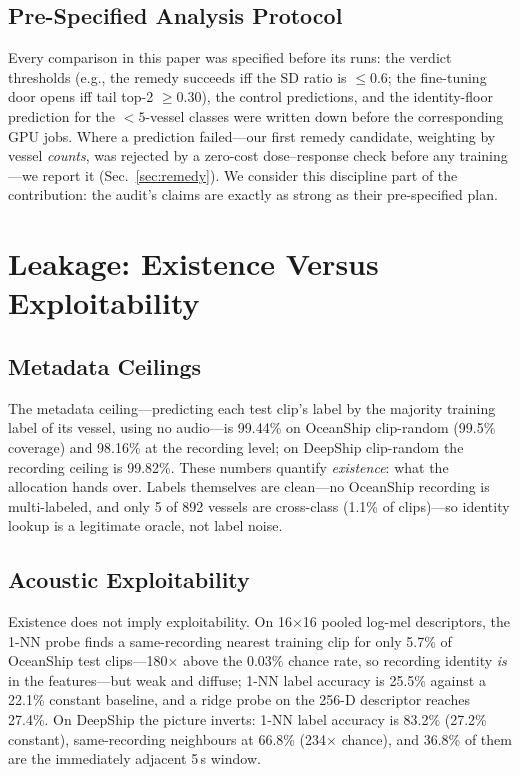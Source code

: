 ﻿\documentclass[journal]{IEEEtran}
\begin{document}
\subsection{Pre-Specified Analysis Protocol}
Every comparison in this paper was specified before its runs: the verdict thresholds (e.g., the
remedy succeeds iff the SD ratio is $\le0.6$; the fine-tuning door opens iff tail top-2
$\ge0.30$), the control predictions, and the identity-floor prediction for the $<5$-vessel classes
were written down before the corresponding GPU jobs. Where a prediction failed---our first remedy
candidate, weighting by vessel \emph{counts}, was rejected by a zero-cost dose--response check
before any training---we report it (Sec.~\ref{sec:remedy}). We consider this discipline part of
the contribution: the audit's claims are exactly as strong as their pre-specified plan.

\section{Leakage: Existence Versus Exploitability}
\label{sec:leak}

\subsection{Metadata Ceilings}
The metadata ceiling---predicting each test clip's label by the majority training label of its
vessel, using no audio---is 99.44\% on OceanShip clip-random (99.5\% coverage) and 98.16\% at the
recording level; on DeepShip clip-random the recording ceiling is 99.82\%. These numbers quantify
\emph{existence}: what the allocation hands over. Labels themselves are clean---no OceanShip
recording is multi-labeled, and only 5 of 892 vessels are cross-class (1.1\% of clips)---so
identity lookup is a legitimate oracle, not label noise.

\subsection{Acoustic Exploitability}
Existence does not imply exploitability. On 16$\times$16 pooled log-mel descriptors, the 1-NN probe
finds a same-recording nearest training clip for only 5.7\% of OceanShip test clips---180$\times$
above the 0.03\% chance rate, so recording identity \emph{is} in the features---but weak and
diffuse; 1-NN label accuracy is 25.5\% against a 22.1\% constant baseline, and a ridge probe on the
256-D descriptor reaches 27.4\%. On DeepShip the picture inverts: 1-NN label accuracy is 83.2\%
(27.2\% constant), same-recording neighbours at 66.8\% (234$\times$ chance), and 36.8\% of them are
the immediately adjacent 5\,s window.
\end{document}
